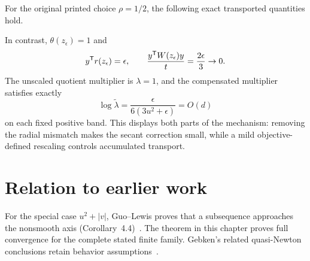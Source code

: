 For the original printed choice $\rho=1/2$, the following exact transported quantities hold.

In contrast, $\theta(z_\epsilon)=1$ and
\[
 y^{\mathsf T} r(z_\epsilon)=\epsilon,\qquad
 \frac{y^{\mathsf T} W(z_\epsilon)y}{t}=\frac{2\epsilon}{3}\to0.
\]
The unscaled quotient multiplier is $\lambda=1$, and the compensated multiplier satisfies exactly
\[
 \log\widetilde\lambda
 =\frac{\epsilon}{6(3u^2+\epsilon)}=O(d)
\]
on each fixed positive band. This displays both parts of the mechanism: removing the radial mismatch makes the secant correction small, while a mild objective-defined rescaling controls accumulated transport.


\endgroup


\section*{Relation to earlier work}
For the special case $u^2+|v|$, Guo--Lewis proves that a subsequence approaches the nonsmooth axis (Corollary~4.4)~\cite{GL18}. The theorem in this chapter proves full convergence for the complete stated finite family. Gebken's related quasi-Newton conclusions retain behavior assumptions~\cite{BG}.

